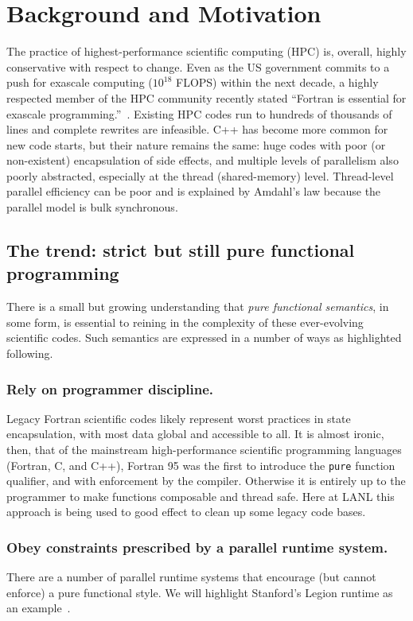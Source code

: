 \documentclass{llncs}
\begin{document}
\section{Background and Motivation}
The practice of highest-performance scientific computing (HPC) is, overall,
highly conservative with respect to change.  Even as the US government commits
to a push for exascale computing ($10^{18}$ FLOPS) within the next decade, a
highly respected member of the HPC community recently stated ``Fortran is
essential for exascale programming.''~\cite{Heroux16}.  Existing HPC codes run
to hundreds of thousands of lines and complete rewrites are infeasible.  C++
has become more common for new code starts, but their nature remains the same:
huge codes with poor (or non-existent) encapsulation of side effects, and
multiple levels of parallelism also poorly abstracted, especially at the
thread (shared-memory) level.  Thread-level parallel efficiency can be poor
and is explained by Amdahl's law because the parallel model is bulk synchronous.

\subsection{The trend: strict but still pure functional programming}
There is a small but growing understanding that \emph{pure functional
  semantics}, in some form, is essential to reining in the complexity of these
ever-evolving scientific codes.  Such semantics are expressed in a number
of ways as highlighted following.

\subsubsection{Rely on programmer discipline.}
Legacy Fortran scientific codes likely represent worst practices in state
encapsulation, with most data global and accessible to all.  It is almost
ironic, then, that of the mainstream high-performance scientific programming
languages (Fortran, C, and C++), Fortran 95 was the first to introduce the
\texttt{pure} function qualifier, and with enforcement by the compiler.
Otherwise it is entirely up to the programmer to make functions composable
and thread safe.  Here at LANL this approach is being used to good effect
to clean up some legacy code bases.

\subsubsection{Obey constraints prescribed by a parallel runtime system.}
There are a number of parallel runtime systems that encourage (but cannot
enforce) a pure functional style.  We will highlight Stanford's Legion
runtime as an example~\cite{Bauer12}.
\end{document}

